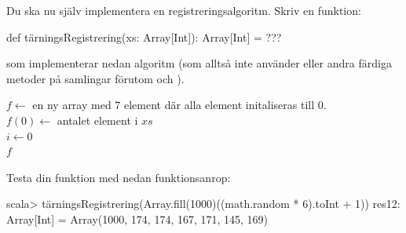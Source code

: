 \Subtask Du ska nu själv implementera en registreringsalgoritm. Skriv en funktion:
\begin{Code}
def tärningsRegistrering(xs: Array[Int]): Array[Int] = ???
\end{Code}
som implementerar nedan algoritm (som alltså inte använder  eller andra färdiga metoder på samlingar förutom  och ).

\begin{algorithm}[H]

 $f \leftarrow$ en ny array med $7$ element där alla element initaliseras till 0.\\
 $f(0) \leftarrow$ antalet element i $xs$ \\
 $i \leftarrow 0$  \\
 \Return $f$
\end{algorithm}

Testa din funktion med nedan funktionsanrop:
\begin{REPL}
scala> tärningsRegistrering(Array.fill(1000)((math.random * 6).toInt + 1))
res12: Array[Int] = Array(1000, 174, 174, 167, 171, 145, 169)
\end{REPL}

\SOLUTION


\TaskSolved \what


\SubtaskSolved  {}

